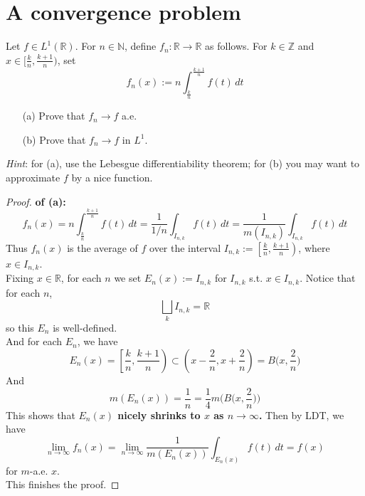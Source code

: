 \documentclass[lang=cn,11pt]{elegantbook}
\begin{document}
\section{A convergence problem}
  Let $f\in L^1(\mathbb{R})$. For $n\in\mathbb{N}$, define $f_n\colon \mathbb{R} \to\mathbb{R}$ as follows. For $k\in\mathbb{Z}$ and $x\in[\frac{k}{n},\frac{k+1}{n})$, set \[
    f_n(x):=n\int_{\frac{k}{n}}^{\frac{k+1}{n}}f(t)\,dt
  \]
  \begin{itemize}
  \item[(a)]Prove that $f_n\to f$ a.e.
  \item[(b)]Prove that $f_n\to f$ in $L^1$.
  \end{itemize}
\textit{Hint}: for (a), use the Lebesgue differentiability theorem; for (b) you may want to approximate $f$ by a nice function.
\begin{proof}
    \textbf{of (a):}
    \[
f_n(x) = n\int_{\frac{k}{n}}^{\frac{k+1}{n}}f(t)\,dt  = \frac{1}{1/n} \int_{I_{n,k}} f(t)\,dt =  \frac{1}{m(I_{n,k})} \int_{I_{n,k}} f(t)\,dt
\]
Thus $f_n(x)$ is the average of \( f \) over the interval \( I_{n,k} := \left[\frac{k}{n}, \frac{k+1}{n}\right) \), where $x \in I_{n,k}$.\\
Fixing $x\in \mathbb{R}$, for each $n$ we set $E_n(x) := I_{n,k}$ for $I_{n,k}$ s.t. $x\in I_{n,k}$. Notice that for each $n$,\[
\bigsqcup_{k} I_{n,k} = \mathbb{R}
\]so this $E_n$ is well-defined.\\
And for each $E_n$, we have \[
E_n(x) = \left[\frac{k}{n}, \frac{k+1}{n}\right)  \subset \left(x- \frac{2}{n},x+ \frac{2}{n} \right) = B\big(x,\frac{2}{n}\big)
\]
And \[
m(E_n (x)) = \frac{1}{n} = \frac{1}{4} m\bigg(B\big(x,\frac{2}{n}\big)\bigg)
\]
This shows that \textbf{\( E_n(x)\) nicely shrinks to $x$ as $n\to \infty$.} Then by LDT, we have \[
\lim_{n\to \infty}f_n(x) = \lim_{n\to \infty}  \frac{1}{m(E_n(x))} \int_{E_n(x)} f(t)\,dt =  f(x)
\] for $m$-a.e. $x$.\\
This finishes the proof.
\end{proof}
\end{document}
